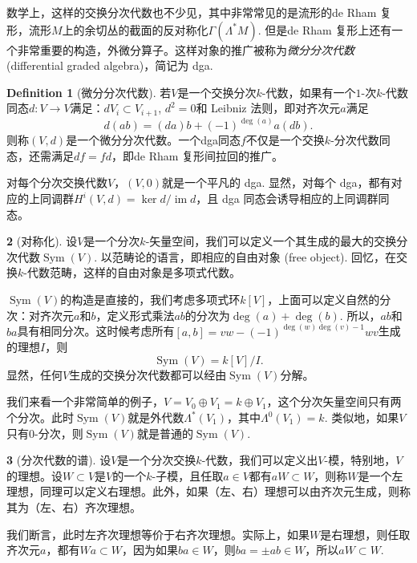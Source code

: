 \documentclass[11pt]{article}
\theoremstyle{definition}
\newtheorem{para}{}[section]
\newtheorem{defi}[para]{Definition}
\theoremstyle{plain}
\begin{document}
数学上，这样的交换分次代数也不少见，其中非常常见的是流形的de Rham 复形，流形$M$上的余切丛的截面的反对称化$\Gamma(\Lambda^*M)$. 但是de Rham 复形上还有一个非常重要的构造，外微分算子。这样对象的推广被称为\textit{微分分次代数} (differential graded algebra)，简记为 dga. 

\begin{defi}[微分分次代数]
    若$V$是一个交换分次$k$-代数，如果有一个$1$-次$k$-代数同态$d:V\to V$满足：$dV_i\subset V_{i+1}$, $d^2=0$和 Leibniz 法则，即对齐次元$a$满足
    \[
        d(ab)=(da)b+(-1)^{\deg(a)}a(db).
    \]
    则称$(V,d)$是一个微分分次代数。一个dga同态$f$不仅是一个交换$k$-分次代数同态，还需满足$df=fd$，即de Rham 复形间拉回的推广。
\end{defi}

对每个分次交换代数$V$，$(V,0)$就是一个平凡的 dga. 
显然，对每个 dga，都有对应的上同调群$H^i(V,d)=\ker d/\operatorname{im} d$，且 dga 同态会诱导相应的上同调群同态。

\begin{para}[对称化]
    设$V$是一个分次$k$-矢量空间，我们可以定义一个其生成的最大的交换分次代数$\operatorname{Sym}(V)$. 以范畴论的语言，即相应的自由对象 (free object). 回忆，在交换$k$-代数范畴，这样的自由对象是多项式代数。

    $\operatorname{Sym}(V)$的构造是直接的，我们考虑多项式环$k[V]$，上面可以定义自然的分次：对齐次元$a$和$b$，定义形式乘法$ab$的分次为$\deg(a)+\deg(b)$. 所以，$ab$和$ba$具有相同分次。这时候考虑所有$[a,b]=vw-(-1)^{\deg(w)\deg(v)-1}wv$生成的理想$I$，则
    \[
        \operatorname{Sym}(V)=k[V]/I.
    \]
    显然，任何$V$生成的交换分次代数都可以经由$\operatorname{Sym}(V)$分解。
\end{para}

我们来看一个非常简单的例子，$V=V_0\oplus V_1=k\oplus V_1$，这个分次矢量空间只有两个分次。此时$\operatorname{Sym}(V)$就是外代数$\Lambda^*(V_1)$，其中$\Lambda^0(V_1)=k$. 类似地，如果$V$只有$0$-分次，则$\operatorname{Sym}(V)$就是普通的$\operatorname{Sym}(V)$.

\begin{para}[分次代数的谱]
    设$V$是一个分次交换$k$-代数，我们可以定义出$V$-模，特别地，$V$的理想。设$W\subset V$是$V$的一个$k$-子模，且任取$a\in V$都有$aW\subset W$，则称$W$是一个左理想，同理可以定义右理想。此外，如果（左、右）理想可以由齐次元生成，则称其为（左、右）齐次理想。

    我们断言，此时左齐次理想等价于右齐次理想。实际上，如果$W$是右理想，则任取齐次元$a$，都有$Wa\subset W$，因为如果$ba\in W$，则$ba=\pm ab\in W$，所以$aW\subset W$.
\end{para}
\end{document}
